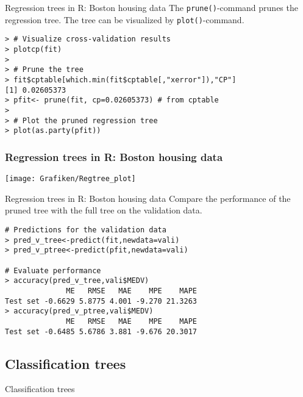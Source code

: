 \documentclass{beamer}
\newcommand{\code}[1]{\texttt{#1}}
\begin{document}
\begin{frame}[fragile]{Regression trees in R: Boston housing data}
The \code{prune()}-command prunes the regression tree. The tree can be visualized by \code{plot()}-command.

\begin{lstlisting}
> # Visualize cross-validation results
> plotcp(fit)
>
> # Prune the tree
> fit$cptable[which.min(fit$cptable[,"xerror"]),"CP"]
[1] 0.02605373
> pfit<- prune(fit, cp=0.02605373) # from cptable
>
> # Plot the pruned regression tree
> plot(as.party(pfit))
\end{lstlisting}
\end{frame}

\begin{frame}
\frametitle{Regression trees in R: Boston housing data}
\begin{center}
\texttt{[image: Grafiken/Regtree\_plot]}
\end{center}
\end{frame}

\begin{frame}[fragile]{Regression trees in R: Boston housing data}
Compare the performance of the pruned tree with the full tree on the validation data.
\begin{lstlisting}
# Predictions for the validation data
> pred_v_tree<-predict(fit,newdata=vali)
> pred_v_ptree<-predict(pfit,newdata=vali)

# Evaluate performance
> accuracy(pred_v_tree,vali$MEDV)
              ME   RMSE   MAE    MPE    MAPE
Test set -0.6629 5.8775 4.001 -9.270 21.3263
> accuracy(pred_v_ptree,vali$MEDV)
              ME   RMSE   MAE    MPE    MAPE
Test set -0.6485 5.6786 3.881 -9.676 20.3017
\end{lstlisting}
\end{frame}

\subsection{Classification trees}


\begin{frame}
	\begin{center}
		\Large{\textcolor{dkblue}{Classification trees}}
	\end{center}
\end{frame}
\end{document}
